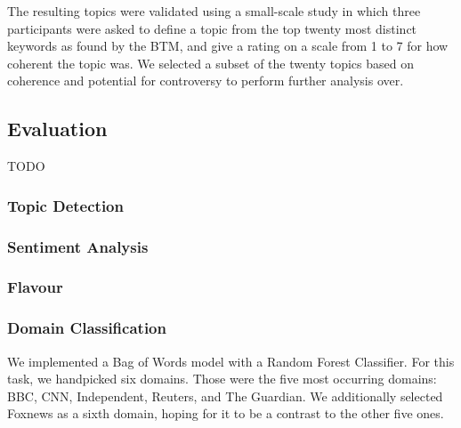 \documentclass[final]{ieee}
\begin{document}
The resulting topics were validated using a small-scale study in which three participants were asked to define a topic from the top twenty most distinct keywords as found by the BTM, and give a rating on a scale from 1 to 7 for how coherent the topic was. We selected a subset of the twenty topics based on coherence and potential for controversy to perform further analysis over.

\subsection{Evaluation}
TODO


\subsubsection{Topic Detection}

\subsubsection{Sentiment Analysis}

\subsubsection{Flavour}

\subsubsection{Domain Classification}
We implemented a Bag of Words model with a Random Forest Classifier. For this task, we handpicked six domains. Those were the five most occurring domains: BBC, CNN, Independent, Reuters, and The Guardian. We additionally selected Foxnews as a sixth domain, hoping for it to be a contrast to the other five ones.





\end{document}

